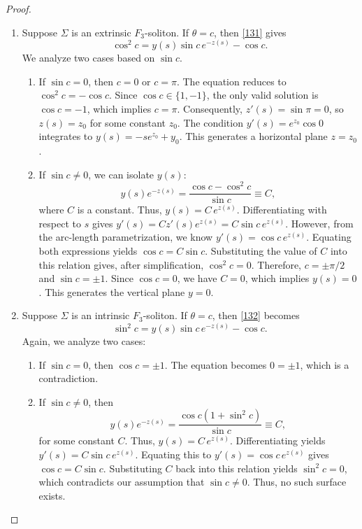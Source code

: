 \documentclass[a4paper,12pt]{amsart}
\theoremstyle{plain}
\theoremstyle{definition}
\begin{document}
\begin{proof}
\begin{enumerate}
\item Suppose $\Sigma$ is an extrinsic $F_3$-soliton. If $\theta = c$, then \eqref{131} gives
$$\cos^2 c = y(s)\sin c \, e^{-z(s)} - \cos c.$$
We analyze two cases based on $\sin c$.
\begin{enumerate}
 \item If $\sin c = 0$, then $c = 0$ or $c = \pi$. The equation reduces to $\cos^2 c =- \cos c$. Since $\cos c \in \{1, -1\}$, the only valid solution is $\cos c = -1$, which implies $c = \pi$. Consequently, $z'(s) = \sin \pi = 0$, so $z(s) = z_0$ for some constant $z_0$. The condition $y'(s) = e^{z_0}\cos 0$ integrates to $y(s) =- s e^{z_0} + y_0$. This generates a horizontal plane $z = z_0$.
 \item If $\sin c \neq 0$, we can isolate $y(s)$:
 $$y(s)e^{-z(s)} = \frac{\cos c - \cos^2 c}{\sin c} \equiv C,$$
 where $C$ is a constant. Thus, $y(s) = C\, e^{z(s)}$. Differentiating with respect to $s$ gives $y'(s) = C z'(s) e^{z(s)} = C \sin c \, e^{z(s)}$. However, from the arc-length parametrization, we know $y'(s) = \cos c \, e^{z(s)}$. Equating both expressions yields $\cos c = C \sin c$. Substituting the value of $C$ into this relation gives, after simplification, $ \cos^2 c = 0$. 
 Therefore, $c = \pm \pi/2$ and $\sin c = \pm 1$. Since $\cos c = 0$, we have $C = 0$, which implies $y(s) = 0$. This generates the vertical plane $y = 0$.
\end{enumerate}
\item Suppose $\Sigma$ is an intrinsic $F_3$-soliton. If $\theta = c$, then \eqref{132} becomes
$$\sin^2 c = y(s)\sin c \, e^{-z(s)} - \cos c.$$
Again, we analyze two cases:
\begin{enumerate}
 \item If $\sin c = 0$, then $\cos c = \pm 1$. The equation becomes $0 = \pm 1$, which is a contradiction.
 \item If $\sin c \neq 0$, then
 $$y(s)e^{-z(s)} = \frac{\cos c (1+\sin^2 c)}{\sin c} \equiv C,$$
 for some constant $C$. Thus, $y(s) = C\, e^{z(s)}$. Differentiating yields $y'(s) = C \sin c \, e^{z(s)}$. Equating this to $y'(s) = \cos c \, e^{z(s)}$ gives $\cos c = C \sin c$. Substituting $C$ back into this relation yields $ \sin^2 c = 0$, 
 which contradicts our assumption that $\sin c \neq 0$. Thus, no such surface exists.
\end{enumerate}
\end{enumerate}
\end{proof}
\end{document}
